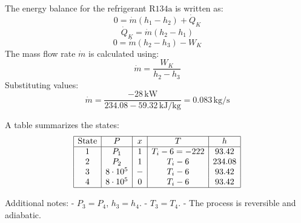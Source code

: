 The energy balance for the refrigerant \( \text{R134a} \) is written as:  
\[
0 = \dot{m} \left( h_1 - h_2 \right) + \dot{Q}_K
\]
\[
\dot{Q}_K = \dot{m} \left( h_2 - h_1 \right)
\]
\[
0 = \dot{m} \left( h_2 - h_3 \right) - W_K
\]
The mass flow rate \( \dot{m} \) is calculated using:  
\[
\dot{m} = \frac{W_K}{h_2 - h_3}
\]
Substituting values:  
\[
\dot{m} = \frac{-28 \, \text{kW}}{234.08 - 59.32 \, \text{kJ/kg}} = 0.083 \, \text{kg/s}
\]

A table summarizes the states:  
\[
\begin{array}{|c|c|c|c|c|}
\hline
\text{State} & P & x & T & h \\
\hline
1 & P_1 & 1 & T_i - 6 = -222 & 93.42 \\
2 & P_2 & 1 & T_i - 6 & 234.08 \\
3 & 8 \cdot 10^5 & - & T_i - 6 & 93.42 \\
4 & 8 \cdot 10^5 & 0 & T_i - 6 & 93.42 \\
\hline
\end{array}
\]

Additional notes:  
- \( P_3 = P_4 \), \( h_3 = h_4 \).  
- \( T_3 = T_4 \).  
- The process is reversible and adiabatic.